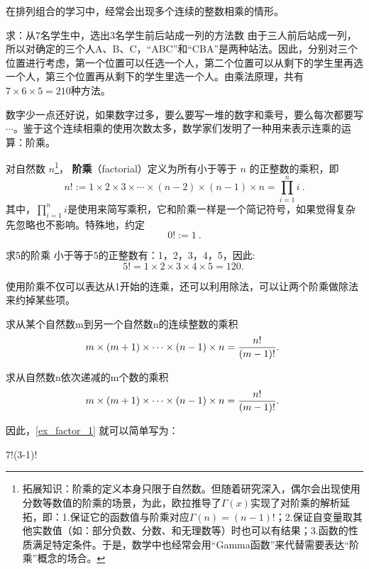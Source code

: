 
\begin{issues}
\issueDraft
\end{issues}


在排列组合的学习中，经常会出现多个连续的整数相乘的情形。

\begin{example}{求：从7名学生中，选出3名学生前后站成一列的方法数}\label{ex_factor_1}
由于三人前后站成一列，所以对确定的三个人A、B、C，“ABC”和“CBA”是两种站法。因此，分别对三个位置进行考虑，第一个位置可以任选一个人，第二个位置可以从剩下的学生里再选一个人，第三个位置再从剩下的学生里选一个人。由乘法原理，共有$7\times6\times5=210$种方法。
\end{example}

数字少一点还好说，如果数字过多，要么要写一堆的数字和乘号，要么每次都要写$\cdots$。鉴于这个连续相乘的使用次数太多，数学家们发明了一种用来表示连乘的运算：阶乘。

对自然数 $n$\footnote{拓展知识：阶乘的定义本身只限于自然数。但随着研究深入，偶尔会出现使用分数等数值的阶乘的场景，为此，欧拉推导了$\Gamma(x)$实现了对阶乘的解析延拓，即：1.保证它的函数值与阶乘对应$\Gamma(n)=(n-1)!$；2.保证自变量取其他实数值（如：部分负数、分数、和无理数等）时也可以有结果；3.函数的性质满足特定条件。于是，数学中也经常会用“Gamma函数”来代替需要表达“阶乘”概念的场合。}， \textbf{阶乘}（factorial）定义为所有小于等于 $n$ 的正整数的乘积，即
\begin{equation}
n! := 1 \times 2 \times 3 \times \cdots \times(n - 2)\times(n - 1)\times n=\prod_{i = 1}^n i ~.
\end{equation}
其中，$\prod_{i = 1}^n i$是使用来简写乘积，它和阶乘一样是一个简记符号，如果觉得复杂先忽略也不影响。特殊地，约定
\begin{equation}
0! := 1~.
\end{equation}

\begin{example}{求5的阶乘}
小于等于5的正整数有：1，2，3，4，5，因此:
$$5! = 1\times 2\times 3\times 4\times 5 = 120.~$$
\end{example}

使用阶乘不仅可以表达从1开始的连乘，还可以利用除法，可以让两个阶乘做除法来约掉某些项。

\begin{example}{求从某个自然数m到另一个自然数n的连续整数的乘积}
\begin{equation}
m\times(m+1)\times\cdots \times(n-1)\times n={n!\over (m-1)!}.~
\end{equation}
\end{example}

\begin{example}{求从自然数n依次递减的m个数的乘积}
\begin{equation}
m\times(m+1)\times\cdots \times(n-1)\times n={n!\over (m-1)!}.~
\end{equation}
\end{example}


因此，\autoref{ex_factor_1} 就可以简单写为：

7!\over (3-1)!
